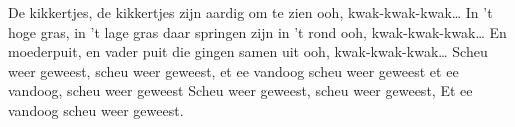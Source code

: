 \beginverse
De kikkertjes, de kikkertjes
zijn aardig om te zien          
ooh, kwak-kwak-kwak… 
\endverse
\beginchorus
In 't hoge gras, in 't lage gras
daar springen zijn in 't rond  
ooh, kwak-kwak-kwak… 
\endchorus
\beginverse
En moederpuit, en vader puit
die gingen samen uit              
ooh, kwak-kwak-kwak… 
\endverse
\beginverse
Scheu weer geweest, scheu weer geweest,
et ee vandoog scheu weer geweest 
\endverse
\beginverse
et ee vandoog, scheu weer geweest 
\endverse
\beginverse
Scheu weer geweest, scheu weer geweest,
Et ee vandoog scheu weer geweest. 
\endverse    
\endsong   
